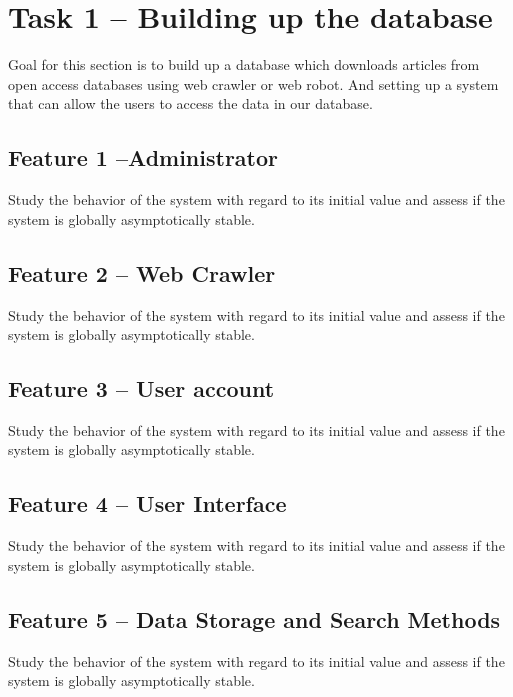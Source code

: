 \documentclass[a4paper]{article} %
\begin{document}
	\section*{Task 1 -- Building up the database}
	\label{task1}
	
	Goal for this section is to build up a database which downloads articles from open access databases using web crawler or web robot. And setting up a system that can allow the users to access the data in our database.
	
	\subsection*{Feature 1 --Administrator}
	\label{task1:feature1}
	
	Study the behavior of the system with regard to its initial value and assess if the system is globally asymptotically stable.
	
	\subsection*{Feature 2 -- Web Crawler}
	\label{task1:feature2}
	
	Study the behavior of the system with regard to its initial value and assess if the system is globally asymptotically stable.
	
	\subsection*{Feature 3 -- User account}
	\label{task1:feature3}
	
	Study the behavior of the system with regard to its initial value and assess if the system is globally asymptotically stable.
	
	\subsection*{Feature 4 -- User Interface}
	\label{task1:feature4}
	
	Study the behavior of the system with regard to its initial value and assess if the system is globally asymptotically stable.
	
	\subsection*{Feature 5 -- Data Storage and Search Methods}
	\label{task1:feature5}
	
	Study the behavior of the system with regard to its initial value and assess if the system is globally asymptotically stable.
	
\end{document}
